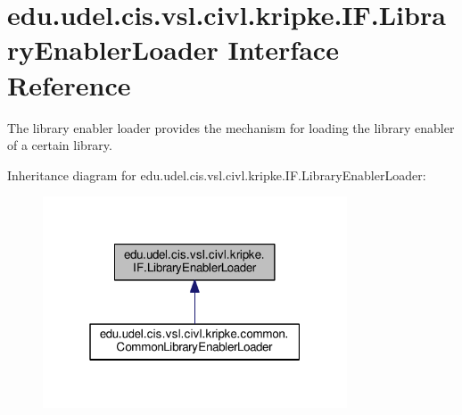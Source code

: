 \hypertarget{interfaceedu_1_1udel_1_1cis_1_1vsl_1_1civl_1_1kripke_1_1IF_1_1LibraryEnablerLoader}{}\section{edu.\+udel.\+cis.\+vsl.\+civl.\+kripke.\+I\+F.\+Library\+Enabler\+Loader Interface Reference}
\label{interfaceedu_1_1udel_1_1cis_1_1vsl_1_1civl_1_1kripke_1_1IF_1_1LibraryEnablerLoader}


The library enabler loader provides the mechanism for loading the library enabler of a certain library.  




Inheritance diagram for edu.\+udel.\+cis.\+vsl.\+civl.\+kripke.\+I\+F.\+Library\+Enabler\+Loader\+:
\nopagebreak
\begin{figure}[H]
\begin{center}
\leavevmode
\includegraphics[width=256pt]{interfaceedu_1_1udel_1_1cis_1_1vsl_1_1civl_1_1kripke_1_1IF_1_1LibraryEnablerLoader__inherit__graph}
\end{center}
\end{figure}
